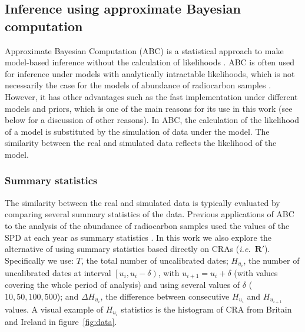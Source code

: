 \documentclass[a4paper]{article}
\begin{document}
\subsection*{Inference using approximate Bayesian computation}

Approximate Bayesian Computation (ABC) is a statistical approach to make model-based inference without the calculation of likelihoods \parencite[see][for a review]{Sunnaker2013}. ABC is often used for inference under models with analytically intractable likelihoods, which is not necessarily the case for the models of abundance of radiocarbon samples \parencite[\emph{e.g.}][]{Crema2021b}. However, it has other advantages such as the fast implementation under different models and priors, which is one of the main reasons for its use in this work (see below for a discussion of other reasons). In ABC, the calculation of the likelihood of a model is substituted by the simulation of data under the model. The similarity between the real and simulated data reflects the likelihood of the model.
\\

\subsubsection*{Summary statistics}

The similarity between the real and simulated data  is typically evaluated by comparing several summary statistics of the data. Previous applications of ABC to the analysis of the abundance of radiocarbon samples used the values of the SPD at each year as summary statistics \parencite{Porcic2020,DiNapoli2021}. In this work we also explore the alternative of using summary statistics based directly on CRAs (\emph{i.e.}\ $\bm{R}'$). Specifically we use: $T$, the total number of uncalibrated dates; $H_{u_i}$, the number of uncalibrated dates at interval $\left[u_i, u_i-\delta\right)$, with $u_{i+1}=u_i+\delta$ (with values covering the whole period of analysis) and using several values of $\delta$ ($10, 50, 100, 500$); and $\Delta H_{u_i}$, the difference between consecutive $H_{u_i}$ and $H_{u_{i+1}}$ values. A visual example of $H_{u_i}$ statistics is the histogram of CRA from Britain and Ireland in figure~\ref{fig:data}.
\\
\end{document}
